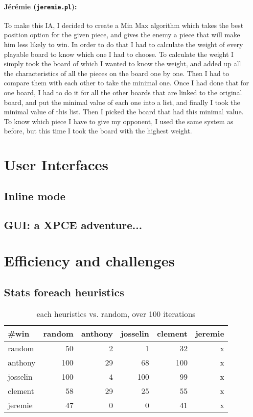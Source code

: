 \documentclass[a4paper,11pt]{article}
\newcommand{\tw}[1]{\texttt{#1}}
\newcommand{\mytable}[3]{
	\begin{table}[ht]
		\begin{center}
			\begin{tabular}{#2}
				#3
			\end{tabular}
		\caption{#1}
		\end{center}
	\end{table}
}
\begin{document}
		\paragraph{Jérémie (\tw{jeremie.pl}):} To make this IA, I decided to create a Min Max algorithm which takes the best position option for the given piece, and gives the enemy a piece that will make him less likely to win. In order to do that I had to calculate the weight of every playable board to know which one I had to choose. To calculate the weight I simply took the board of which I wanted to know the weight, and added up all the characteristics of all the pieces on the board one by one. Then I had to compare them with each other to take the minimal one. Once I had done that for one board, I had to do it for all the other boards that are linked to the original board, and put the minimal value of each one into a list, and finally I took the minimal value of this list. Then I picked the board that had this minimal value. \\
		To know which piece I have to give my opponent, I used the same system as before, but this time I took the board with the highest weight.

	
	\section{User Interfaces}
		\subsection{Inline mode}
		\subsection{GUI: a XPCE adventure...}
	
	\section{Efficiency and challenges}	
		\subsection{Stats foreach heuristics}
			\mytable{each heuristics vs. random, over 100 iterations}{|l||r|r|r|r|r|}{
				\hline
				\#win		& random	& anthony	& josselin	& clement	& jeremie		\\\hline\hline
				random		& 50		& 2			& 1			& 32		& x				\\\hline
				anthony		& 100		& 29		& 68		& 100		& x				\\\hline
				josselin	& 100		& 4			& 100		& 99		& x				\\\hline
				clement		& 58		& 29		& 25		& 55		& x				\\\hline
				jeremie		& 47		& 0			& 0			& 41		& x				\\\hline
			}
\end{document}
